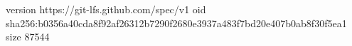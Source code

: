 version https://git-lfs.github.com/spec/v1
oid sha256:b0356a40cda8f92af26312b7290f2680e3937a483f7bd20e407b0ab8f30f5ea1
size 87544
